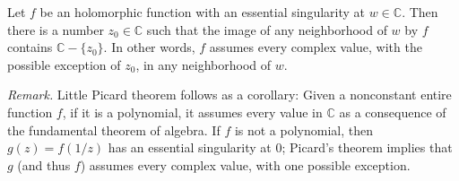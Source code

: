 \documentclass[12pt]{article}
\begin{document}
Let $f$ be an holomorphic function with an essential singularity at $w\in \mathbb{C}$. Then there is a number $z_0\in \mathbb{C}$ such that the image of any neighborhood of $w$ by $f$ contains $\mathbb{C}-\{z_0\}$. In other words, $f$ assumes every complex value, with the possible exception of $z_0$, in any neighborhood of $w$.

\emph{Remark.} Little Picard theorem follows as a corollary:
Given a nonconstant entire function $f$, if it is a polynomial, it assumes every value in $\mathbb{C}$ as a consequence of the fundamental theorem of algebra. If $f$ is not a polynomial, then $g(z)=f(1/z)$ has an essential singularity at $0$; Picard's theorem implies that $g$ (and thus $f$) assumes every complex value, with one possible exception.
\end{document}

